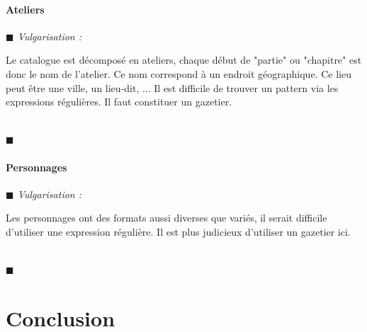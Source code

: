 \documentclass[a4paper, 11pt]{book}
\newenvironment{vulgarisation}
    {
    \textit{\textcolor{dark-blue}{$\blacksquare$  Vulgarisation : \\}}

    }
    {
    ~\\\textcolor{dark-blue}{$\blacksquare$}\\
    }
\begin{document}
\subsubsection{Ateliers}
\begin{vulgarisation}
	Le catalogue est décomposé en ateliers, chaque début de "partie" ou "chapitre" est donc le nom de l'atelier. Ce nom correspond à un endroit géographique. Ce lieu peut être une ville, un lieu-dit, ... Il est difficile de trouver un pattern via les expressions régulières. Il faut constituer un gazetier.
\end{vulgarisation}

\subsubsection{Personnages}
\begin{vulgarisation}
	Les personnages ont des formats aussi diverses que variés, il serait difficile d'utiliser une expression régulière. Il est plus judicieux d'utiliser un gazetier ici. 
\end{vulgarisation}

\chapter{Conclusion}
\end{document}
